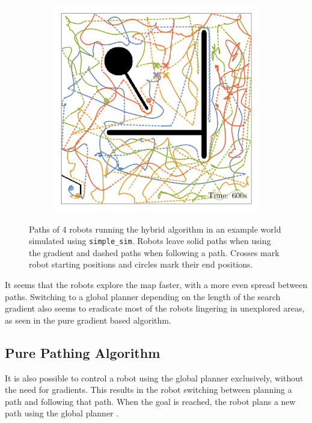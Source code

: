 \begin{figure}[H]
\begin{subfigure}[b]{\w}
    \end{subfigure}
    \begin{subfigure}[b]{\w}
        \centering
        \includegraphics[width=\textwidth]{./figures/plots/paths/search:hybrid-paths-(after-600s).png}
    \end{subfigure}
    \caption{Paths of 4 robots running the hybrid algorithm in an example world simulated using \texttt{simple\_sim}. Robots leave solid paths when using the gradient and dashed paths when following a path. Crosses mark robot starting positions and circles mark their end positions.}
    \label{fig:hybrid-paths}
\end{figure}

It seems that the robots explore the map faster, with a more even spread between paths. Switching to a global planner depending on the length of the search gradient also seems to eradicate most of the robots lingering in unexplored areas, as seen in the pure gradient based algorithm.

\subsection{Pure Pathing Algorithm}
It is also possible to control a robot using the global planner exclusively, without the need for gradients. This results in the robot switching between planning a path and following that path. When the goal is reached, the robot plans a new path using the global planner .

